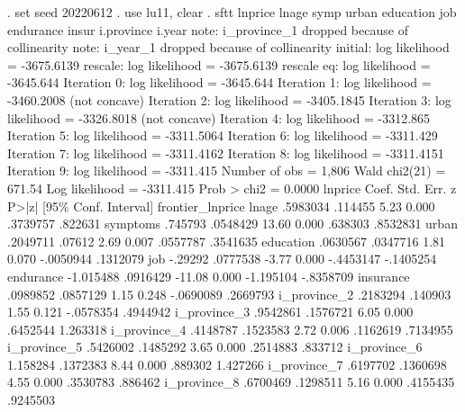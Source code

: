 . set seed 20220612
{\smallskip}
. use lu11, clear
{\smallskip}
. sftt lnprice lnage symp urban education job endurance insur i.province i.year
note: i_province_1 dropped because of collinearity
note: i_year_1 dropped because of collinearity
{\smallskip}
initial:       log likelihood = -3675.6139
rescale:       log likelihood = -3675.6139
rescale eq:    log likelihood =  -3645.644
Iteration 0:   log likelihood =  -3645.644  
Iteration 1:   log likelihood = -3460.2008  (not concave)
Iteration 2:   log likelihood = -3405.1845  
Iteration 3:   log likelihood = -3326.8018  (not concave)
Iteration 4:   log likelihood =  -3312.865  
Iteration 5:   log likelihood = -3311.5064  
Iteration 6:   log likelihood =  -3311.429  
Iteration 7:   log likelihood = -3311.4162  
Iteration 8:   log likelihood = -3311.4151  
Iteration 9:   log likelihood =  -3311.415  
{\smallskip}
{}
{\smallskip}
                                                Number of obs     =      1,806
                                                Wald chi2(21)     =     671.54
Log likelihood =  -3311.415                     Prob > chi2       =     0.0000
{\smallskip}
         lnprice {\VBAR}      Coef.   Std. Err.      z    P>|z|     [95\% Conf. Interval]
frontier_lnprice {\VBAR}
           lnage {\VBAR}   .5983034    .114455     5.23   0.000     .3739757     .822631
        symptoms {\VBAR}    .745793   .0548429    13.60   0.000      .638303    .8532831
           urban {\VBAR}   .2049711     .07612     2.69   0.007     .0557787    .3541635
       education {\VBAR}   .0630567   .0347716     1.81   0.070    -.0050944    .1312079
             job {\VBAR}    -.29292   .0777538    -3.77   0.000    -.4453147   -.1405254
       endurance {\VBAR}  -1.015488   .0916429   -11.08   0.000    -1.195104   -.8358709
       insurance {\VBAR}   .0989852   .0857129     1.15   0.248    -.0690089    .2669793
    i_province_2 {\VBAR}   .2183294    .140903     1.55   0.121    -.0578354    .4944942
    i_province_3 {\VBAR}   .9542861   .1576721     6.05   0.000     .6452544    1.263318
    i_province_4 {\VBAR}   .4148787   .1523583     2.72   0.006     .1162619    .7134955
    i_province_5 {\VBAR}   .5426002   .1485292     3.65   0.000     .2514883     .833712
    i_province_6 {\VBAR}   1.158284   .1372383     8.44   0.000      .889302    1.427266
    i_province_7 {\VBAR}   .6197702   .1360698     4.55   0.000     .3530783     .886462
    i_province_8 {\VBAR}   .6700469   .1298511     5.16   0.000     .4155435    .9245503
